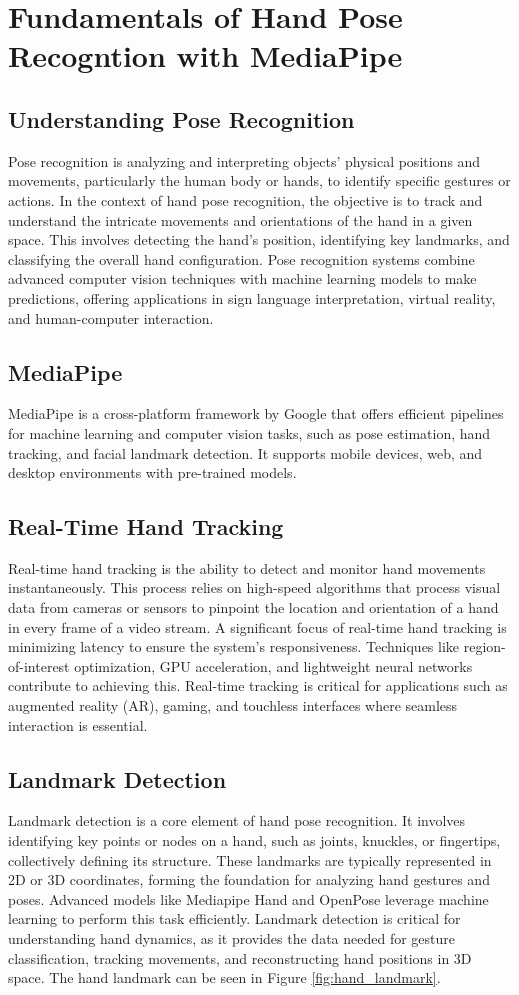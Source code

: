 \chapter{Fundamentals of Hand Pose Recogntion with MediaPipe}

\section{Understanding Pose Recognition}
Pose recognition is analyzing and interpreting objects' physical positions and movements, particularly the human body or hands, to identify specific gestures or actions. In the context of hand pose recognition, the objective is to track and understand the intricate movements and orientations of the hand in a given space. This involves detecting the hand's position, identifying key landmarks, and classifying the overall hand configuration. Pose recognition systems combine advanced computer vision techniques with machine learning models to make predictions, offering applications in sign language interpretation, virtual reality, and human-computer interaction.
\section{MediaPipe}
MediaPipe is a cross-platform framework by Google that offers efficient pipelines for machine learning and computer vision tasks, such as pose estimation, hand tracking, and facial landmark detection. It supports mobile devices, web, and desktop environments with pre-trained models.
\section{Real-Time Hand Tracking}
Real-time hand tracking is the ability to detect and monitor hand movements instantaneously. This process relies on high-speed algorithms that process visual data from cameras or sensors to pinpoint the location and orientation of a hand in every frame of a video stream. A significant focus of real-time hand tracking is minimizing latency to ensure the system's responsiveness. Techniques like region-of-interest optimization, GPU acceleration, and lightweight neural networks contribute to achieving this. Real-time tracking is critical for applications such as augmented reality (AR), gaming, and touchless interfaces where seamless interaction is essential.
\section{Landmark Detection}
Landmark detection is a core element of hand pose recognition. It involves identifying key points or nodes on a hand, such as joints, knuckles, or fingertips, collectively defining its structure. These landmarks are typically represented in 2D or 3D coordinates, forming the foundation for analyzing hand gestures and poses. Advanced models like Mediapipe Hand and OpenPose leverage machine learning to perform this task efficiently. Landmark detection is critical for understanding hand dynamics, as it provides the data needed for gesture classification, tracking movements, and reconstructing hand positions in 3D space. The hand landmark can be seen in Figure \ref{fig:hand_landmark}.

